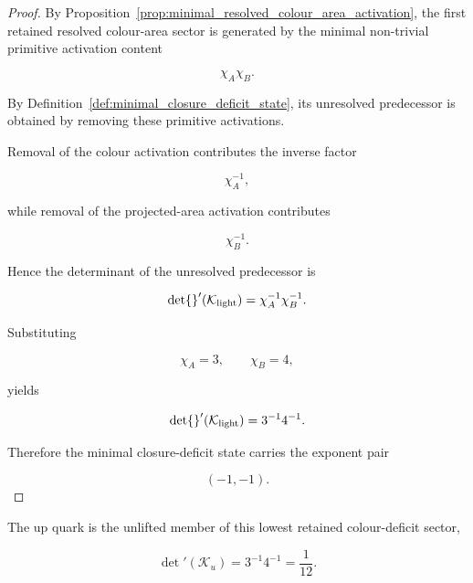 \documentclass[11pt]{article}
\theoremstyle{definition}
\theoremstyle{remark}
\begin{document}
\begin{proof}

By Proposition~\ref{prop:minimal_resolved_colour_area_activation},
the first retained resolved colour-area sector is generated by
the minimal non-trivial primitive activation content

\begin{equation}
\chi_A\chi_B.
\end{equation}

By Definition~\ref{def:minimal_closure_deficit_state}, its
unresolved predecessor is obtained by removing these primitive
activations.

Removal of the colour activation contributes the inverse factor

\begin{equation}
\chi_A^{-1},
\end{equation}

while removal of the projected-area activation contributes

\begin{equation}
\chi_B^{-1}.
\end{equation}

Hence the determinant of the unresolved predecessor is

\begin{equation}
\det{}'(\mathcal K_{\rm light})
=
\chi_A^{-1}\chi_B^{-1}.
\end{equation}

Substituting

\begin{equation}
\chi_A=3,
\qquad
\chi_B=4,
\end{equation}

yields

\begin{equation}
\det{}'(\mathcal K_{\rm light})
=
3^{-1}4^{-1}.
\end{equation}

Therefore the minimal closure-deficit state carries the
exponent pair

\begin{equation}
(-1,-1).
\end{equation}

\end{proof}

The up quark is the unlifted member of this lowest retained
colour-deficit sector,

\begin{equation}
\det{}'(\mathcal K_u)
=
3^{-1}4^{-1}
=
\frac{1}{12}.
\label{eq:up_quark_geometric_selection}
\end{equation}
\end{document}
